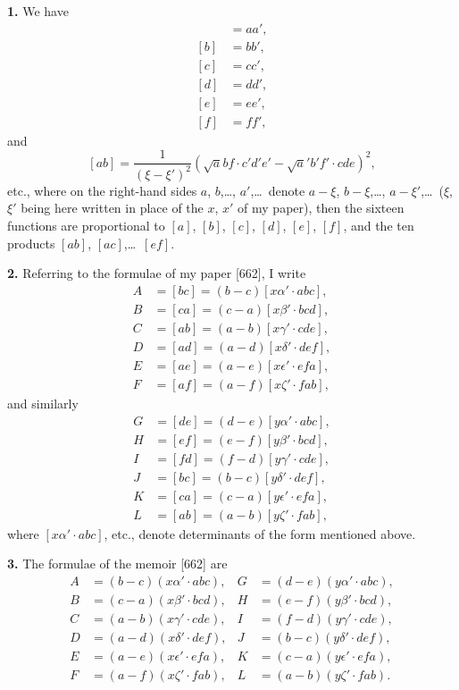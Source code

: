 \documentclass[11pt,a4paper]{article}
\theoremstyle{plain}
\theoremstyle{definition}
\begin{document}
\noindent\textbf{1.} We have
\begin{align*}
[a] &= aa', \\
[b] &= bb', \\
[c] &= cc', \\
[d] &= dd', \\
[e] &= ee', \\
[f] &= ff',
\end{align*}
and
\[
[ab] = \frac{1}{(\xi - \xi')^2} (\surd abf \cdot c'd'e' - \surd a'b'f' \cdot cde)^2,
\]
etc., where on the right-hand sides $a$, $b$,\ldots, $a'$,\ldots\ denote $a - \xi$, $b - \xi$,\ldots, $a - \xi'$,\ldots\ ($\xi$, $\xi'$ being here written in place of the $x$, $x'$ of my paper), then the sixteen functions are proportional to $[a]$, $[b]$, $[c]$, $[d]$, $[e]$, $[f]$, and the ten products $[ab]$, $[ac]$,\ldots\ $[ef]$.

\smallskip

\noindent\textbf{2.} Referring to the formulae of my paper [662], I write
\begin{align*}
A &= [bc] = (b - c)[x\alpha' \cdot abc], \\
B &= [ca] = (c - a)[x\beta' \cdot bcd], \\
C &= [ab] = (a - b)[x\gamma' \cdot cde], \\
D &= [ad] = (a - d)[x\delta' \cdot def], \\
E &= [ae] = (a - e)[x\epsilon' \cdot efa], \\
F &= [af] = (a - f)[x\zeta' \cdot fab],
\end{align*}
and similarly
\begin{align*}
G &= [de] = (d - e)[y\alpha' \cdot abc], \\
H &= [ef] = (e - f)[y\beta' \cdot bcd], \\
I &= [fd] = (f - d)[y\gamma' \cdot cde], \\
J &= [bc] = (b - c)[y\delta' \cdot def], \\
K &= [ca] = (c - a)[y\epsilon' \cdot efa], \\
L &= [ab] = (a - b)[y\zeta' \cdot fab],
\end{align*}
where $[x\alpha' \cdot abc]$, etc., denote determinants of the form mentioned above.

\smallskip

\noindent\textbf{3.} The formulae of the memoir [662] are
\begin{align*}
A &= (b - c)(x\alpha' \cdot abc), & G &= (d - e)(y\alpha' \cdot abc), \\
B &= (c - a)(x\beta' \cdot bcd), & H &= (e - f)(y\beta' \cdot bcd), \\
C &= (a - b)(x\gamma' \cdot cde), & I &= (f - d)(y\gamma' \cdot cde), \\
D &= (a - d)(x\delta' \cdot def), & J &= (b - c)(y\delta' \cdot def), \\
E &= (a - e)(x\epsilon' \cdot efa), & K &= (c - a)(y\epsilon' \cdot efa), \\
F &= (a - f)(x\zeta' \cdot fab), & L &= (a - b)(y\zeta' \cdot fab).
\end{align*}
\end{document}
